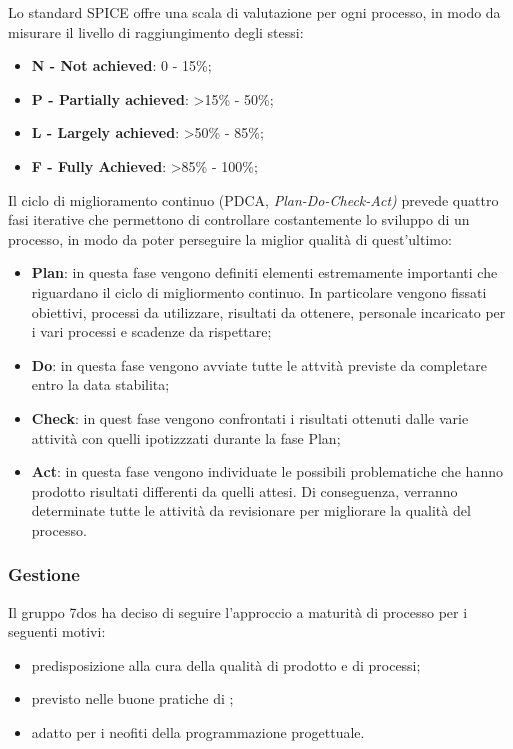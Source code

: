 	Lo standard SPICE offre una scala di valutazione per ogni processo, in modo da misurare il livello di raggiungimento degli stessi:
	\begin{itemize}
	\item \textbf{N - Not achieved}: 0 - 15\%;
	\item \textbf{P - Partially achieved}: >15\% - 50\%;
	\item \textbf{L - Largely achieved}: >50\% - 85\%;
	\item \textbf{F - Fully Achieved}: >85\% - 100\%;
	\end{itemize}

	Il ciclo di miglioramento continuo (PDCA, \emph{Plan-Do-Check-Act)} prevede quattro fasi iterative che permettono di controllare costantemente lo sviluppo di un processo, in modo da poter perseguire la miglior qualità di quest'ultimo:
	\begin{itemize}
	\item \textbf{Plan}: in questa fase vengono definiti elementi estremamente importanti che riguardano il ciclo di migliormento continuo. In particolare vengono fissati obiettivi, processi da utilizzare, risultati da ottenere, personale incaricato per i vari processi e scadenze da rispettare;
	\item \textbf{Do}: in questa fase vengono avviate tutte le attvità previste da completare entro la data stabilita;
	\item \textbf{Check}: in quest fase vengono confrontati i risultati ottenuti dalle varie attività con quelli ipotizzzati durante la fase Plan;
	\item \textbf{Act}: in questa fase vengono individuate le possibili problematiche che hanno prodotto risultati differenti da quelli attesi. Di conseguenza, verranno determinate tutte le attività da revisionare per migliorare la qualità del processo. 
	\end{itemize}

\subsubsection{Gestione}
	Il gruppo 7dos ha deciso di seguire l'approccio a maturità di processo per i seguenti motivi:
	\begin{itemize}
	\item predisposizione alla cura della qualità di prodotto e di processi;
	\item previsto nelle buone pratiche di ;
	\item adatto per i neofiti della programmazione progettuale.
	\end{itemize}
	
